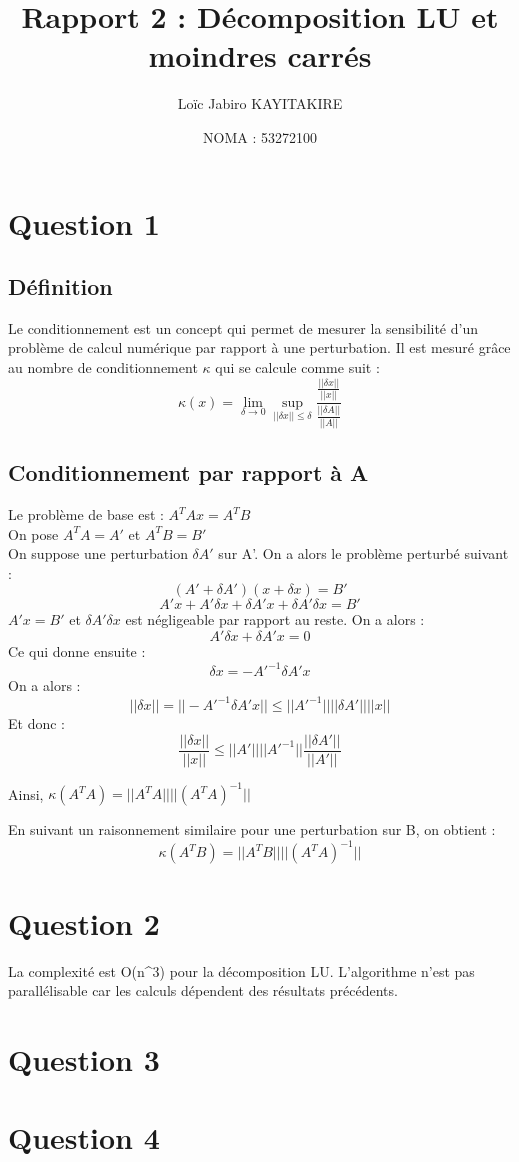 \documentclass[11pt]{article}
\title{Rapport 2 : Décomposition LU et moindres carrés}
\author{Loïc Jabiro KAYITAKIRE}
\date{NOMA : 53272100}
\begin{document}
\maketitle

\section*{Question 1}

\subsection*{Définition}
Le conditionnement est un concept qui permet de mesurer la sensibilité d'un problème de calcul numérique par rapport à une perturbation. 
Il est mesuré grâce au nombre de conditionnement $ \kappa $ qui se calcule comme suit :
$$ \kappa(x) = \lim_{\delta \to 0}   \sup_{||\delta x|| \leq \delta}   \frac{\frac{||\delta x||}{||x||}}{\frac{||\delta A||}{||A||}} $$

\subsection*{Conditionnement par rapport à A}

Le problème de base est : $A^T A x = A^T B$
\\
On pose $A^T A = A'$ et $A^T B = B'$
\\
On suppose une perturbation $ \delta A' $ sur A'. On a alors le problème perturbé suivant : 
$$ (A' + \delta A') (x + \delta x) = B' $$
$$ A'x + A'\delta x + \delta A'x + \delta A' \delta x = B' $$
$ A'x = B'$ et $ \delta A' \delta x$ est négligeable par rapport au reste. On a alors :
$$ A'\delta x + \delta A' x = 0 $$
Ce qui donne ensuite :
$$ \delta x = -A'^{-1} \delta A' x $$
On a alors :
$$ ||\delta x|| = ||-A'^{-1} \delta A' x|| \leq ||A'^{-1}|| ||\delta A'|| ||x|| $$
Et donc :
$$ \frac{||\delta x||}{||x||} \leq ||A'||||A'^{-1}|| \frac{||\delta A'||}{||A'||} $$

Ainsi, $ \kappa(A^T A) = ||A^T A||||(A^T A)^{-1}|| $ 

En suivant un raisonnement similaire pour une perturbation sur B, on obtient :
$$ \kappa(A^T B) = ||A^T B||||(A^T A)^{-1}|| $$

\section*{Question 2}

La complexité est O(n^3) pour la décomposition LU. L'algorithme n'est pas parallélisable car les calculs dépendent des résultats précédents.
\section*{Question 3}

\section*{Question 4}
\end{document}
